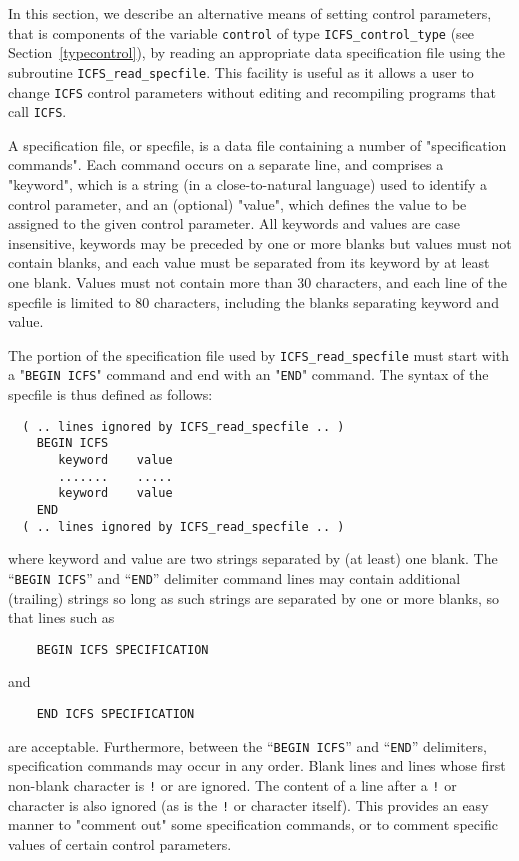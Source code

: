 \documentclass{galahad}
\newcommand{\packagename}{ICFS}
\begin{document}

\galfeatures
\noindent In this section, we describe an alternative means of setting
control parameters, that is components of the variable {\tt control} of type
{\tt \packagename\_control\_type}
(see Section~\ref{typecontrol}),
by reading an appropriate data specification file using the
subroutine {\tt \packagename\_read\_specfile}. This facility
is useful as it allows a user to change  {\tt \packagename} control parameters
without editing and recompiling programs that call {\tt \packagename}.

A specification file, or specfile, is a data file containing a number of
"specification commands". Each command occurs on a separate line,
and comprises a "keyword",
which is a string (in a close-to-natural language) used to identify a
control parameter, and
an (optional) "value", which defines the value to be assigned to the given
control parameter. All keywords and values are case insensitive,
keywords may be preceded by one or more blanks but
values must not contain blanks, and
each value must be separated from its keyword by at least one blank.
Values must not contain more than 30 characters, and
each line of the specfile is limited to 80 characters,
including the blanks separating keyword and value.

The portion of the specification file used by
{\tt \packagename\_read\_specfile}
must start
with a "{\tt BEGIN \packagename}" command and end with an
"{\tt END}" command.  The syntax of the specfile is thus defined as follows:
\begin{verbatim}
  ( .. lines ignored by ICFS_read_specfile .. )
    BEGIN ICFS
       keyword    value
       .......    .....
       keyword    value
    END
  ( .. lines ignored by ICFS_read_specfile .. )
\end{verbatim}
where keyword and value are two strings separated by (at least) one blank.
The ``{\tt BEGIN \packagename}'' and ``{\tt END}'' delimiter command lines
may contain additional (trailing) strings so long as such strings are
separated by one or more blanks, so that lines such as
\begin{verbatim}
    BEGIN ICFS SPECIFICATION
\end{verbatim}
and
\begin{verbatim}
    END ICFS SPECIFICATION
\end{verbatim}
are acceptable. Furthermore,
between the
``{\tt BEGIN \packagename}'' and ``{\tt END}'' delimiters,
specification commands may occur in any order.  Blank lines and
lines whose first non-blank character is {\tt !} or {\tt *} are ignored.
The content
of a line after a {\tt !} or {\tt *} character is also
ignored (as is the {\tt !} or {\tt *}
character itself). This provides an easy manner to "comment out" some
specification commands, or to comment specific values
of certain control parameters.
\end{document}
